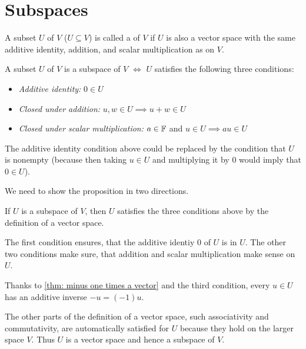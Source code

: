 \section{Subspaces}

\begin{mydef} [subspace]
  A subset $U$ of $V$ ($U \subseteq V$) is called a  of $V$ if $U$ is also a vector space with the same additive identity, addition, and scalar multiplication as on $V$.
\end{mydef}

\begin{thm} 
  A subset $U$ of $V$ is a subspace of $V$ $\iff$ $U$ satisfies the following three conditions:
  \begin{itemize}
    \item \emph{Additive identity:}
    $0 \in U$
    \item \emph{Closed under addition:}
    $u,w \in U \implies u+w \in U$
    \item \emph{Closed under scalar multiplication:}
    $a \in \mathbb{F}$ and $u \in U \implies au \in U$
  \end{itemize}
  The additive identity condition above could be replaced by the condition that $U$ is nonempty (because then taking $u \in U$ and multiplying it by $0$ would imply that $0\in U$).
\end{thm}
\begin{prf} We need to show the proposition in two directions.
  \begin{description}
    \item{} If $U$ is a subspace of $V$, then $U$ satisfies the three conditions above by the definition of a vector space.
    \item{} The first condition ensures, that the additive identiy $0$ of $U$ is in $U$. The other two conditions make sure, that addition and scalar multiplication make sense on $U$.

    Thanks to \ref{thm: minus one times a vector} and the third condition, every $u \in U$ has an additive inverse $-u = (-1) u$.

    The other parts of the definition of a vector space, such associativity and commutativity, are automatically satisfied for $U$ because they hold on the larger space $V$. Thus $U$ is a vector space and hence a subspace of $V$.
  \end{description}
  \vspace{-1.1em}
\end{prf}

